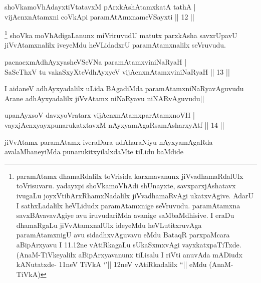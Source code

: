 \begin{shl}
shoVkamoVhAdayxtiVtatavxM pArxkAshAtamxkatA tathA |\\
vijAcnxnAtamxni coVkA\s pi paramAtAmxnameVSayxti \hfill || 12 ||
\end{shl}

\begin{artha}
\footnote[2]{paramAtamx dhamaRdalilx toVrisida karxmavanunx jiVvadhamaRdalUlx toVrisuvaru. yadayxpi shoVkamoVhAdi shUnayxte, savxparxjAshatavx ivugaLu joyxVtibArxRhamxNadalilx jiVvadhamaRvAgi ukatxvAgive. AdarU I sathxLadalilx heVLidudx paramAtamxnige seVruvudu. paramAtamxna savxBAvavavAgiye avu iruvudariMda avanige saMbaMdhisive. I eraDu dhamaRgaLu jiVvAtamxnalUlx ideyeMdu heVLutitxruvAga paramAtamxnigU avu sidadhxvAguvavu eMdu BataqR parxpaMcara aBipArxyavu I 11.12ne vAtiRkagaLu sUkaSxmxvAgi vayxkatxpaTiTxde. (AnaM-TiVkeyalilx aBipArxyavanunx tiLisalu I riVti anuvAda mADiudx kANutatxde- 11neV TiVkA `\stext '|| 12neV vAtiRkadalilx ``\stext || eMdu (AnaM-TiVkA)} shoVka moVhAdigaLanunx miVriruvudU matutx parxkAsha savxrUpavU jiVvAtamxnalilx iveyeMdu heVLidadxrU paramAtamxnalilx seVruvudu.
\end{artha}


\begin{shl}
pacnacxmAdhAyxyasheVSeVNa paramAtamxviniNaRyaH |\\
SaSeThxV tu vakaSxyXteV\s dhAyxyeV vijAcnxnAtamxviniNaRyaH \hfill || 13 ||
\end{shl}

\begin{artha}
I aidaneV adhAyxyadalilx uLida BAgadiMda paramAtamxniNaRyavAguvudu Arane adhAyxyadalilx jiVvAtamx niNaRyavu niNARvAguvudu||
\end{artha}

\begin{shl}
upanAyxsoV davxyoVratarx vijAcnxnAtamxparAtamxnoVH |\\
vayxjAcnxyayxpunarukatxtavxM nAyxyamAgaRsamAsharxyAtf \hfill || 14 ||
\end{shl}

\begin{artha}
jiVvAtamx paramAtamx iveraDara udAharaNiyu nAyxyamAgaRda avalaMbaneyiMda punarukitxyilalxdaMte tiLidu baMdide
\end{artha}


